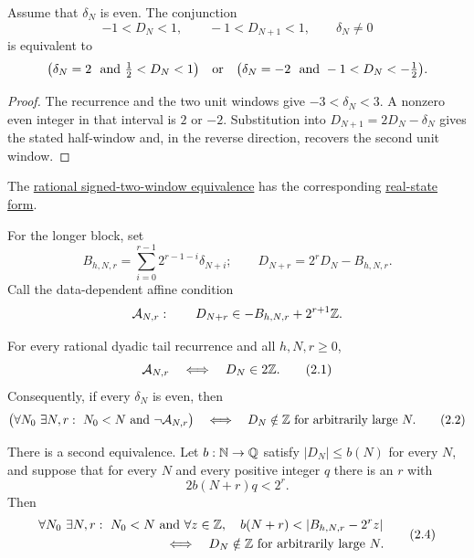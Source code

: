 \documentclass[11pt]{article}
\begin{document}
\begin{theorem}\label{res:signedwindow}
Assume that $\delta_N$ is even.  The conjunction
\[
 -1<D_N<1,\qquad -1<D_{N+1}<1,\qquad \delta_N\ne0
\]
is equivalent to
\[
 \bigl(\delta_N=2\ \hbox{ and }\tfrac12<D_N<1\bigr)
 \quad\hbox{or}\quad
 \bigl(\delta_N=-2\ \hbox{ and }-1<D_N<-\tfrac12\bigr).
\]
\end{theorem}

\begin{proof}
The recurrence and the two unit windows give $-3<\delta_N<3$.  A nonzero even
integer in that interval is $2$ or $-2$.  Substitution into
$D_{N+1}=2D_N-\delta_N$ gives the stated half-window and, in the reverse
direction, recovers the second unit window.
\end{proof}

\noindent The \href{https://github.com/wcook04/plectis-erdos/blob/f36a98bf3d3e6f65f1074e3b800e3293d5b8a51a/ErdosProblems/Erdos251/AffineShiftEscape.lean#L113}{rational signed-two-window equivalence}
has the corresponding \href{https://github.com/wcook04/plectis-erdos/blob/f36a98bf3d3e6f65f1074e3b800e3293d5b8a51a/ErdosProblems/Erdos251/PaperCoreR7.lean#L135}{real-state form}.

For the longer block, set
\[
 B_{h,N,r}=\sum_{i=0}^{r-1}2^{r-1-i}\delta_{N+i};
 \qquad D_{N+r}=2^rD_N-B_{h,N,r}.
\]
Call the data-dependent affine condition
\[
 \mathcal A_{N,r}:\qquad
 D_{N+r}\in -B_{h,N,r}+2^{r+1}\mathbb{Z}.
\]

\begin{theorem}\label{res:affinecollapse}
For every rational dyadic tail recurrence and all $h,N,r\ge0$,
\[
 \mathcal A_{N,r}\quad\Longleftrightarrow\quad D_N\in2\Z.
\tag{2.1}\label{eq:affinecollapse}
\]
Consequently, if every $\delta_N$ is even, then
\[
 \bigl(\forall N_0\ \exists N,r:\ N_0<N\text{ and }\neg\mathcal A_{N,r}\bigr)
 \quad\Longleftrightarrow\quad
 D_N\notin\Z\text{ for arbitrarily large }N.
\tag{2.2}\label{eq:affinecofinal}
\]

There is a second equivalence.  Let $b:\mathbb{N}\to\mathbb{Q}$ satisfy
$|D_N|\le b(N)$ for every $N$, and suppose that for every $N$ and every
positive integer $q$ there is an $r$ with
\[
 2b(N+r)q<2^r.
\tag{2.3}\label{eq:dyadicscale}
\]
Then
\[
 \begin{split}
 &\forall N_0\ \exists N,r:\ N_0<N\text{ and }
   \forall z\in\Z,\quad
   b(N+r)<|B_{h,N,r}-2^rz|\\
 &\hspace{35mm}\Longleftrightarrow\quad
 D_N\notin\Z\text{ for arbitrarily large }N.
 \end{split}
\tag{2.4}\label{eq:fixedcollapse}
\]
\end{theorem}
\end{document}

